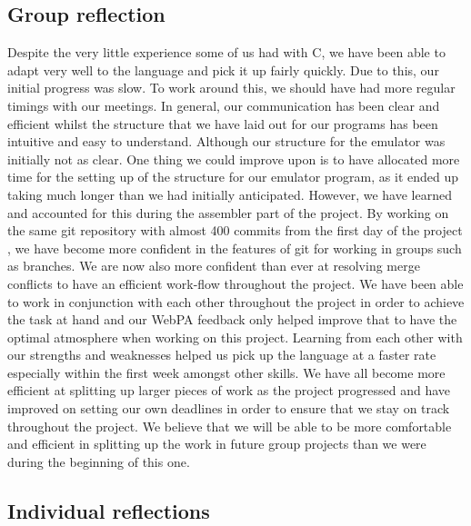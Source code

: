 \documentclass[11pt]{article}
\begin{document}
\subsection{Group reflection}
Despite the very little experience some of us had with C, we have been able to adapt very well to the language and pick it up fairly quickly. Due to this, our initial progress was slow. To work around this, we should have had more regular timings with our meetings. In general, our communication has been clear and efficient whilst the structure that we have laid out for our programs has been intuitive and easy to understand. Although our structure for the emulator was initially not as clear. One thing we could improve upon is to have allocated more time for the setting up of the structure for our emulator program, as it ended up taking much longer than we had initially anticipated. However, we have learned and accounted for this during the assembler part of the project. By working on the same git repository with almost 400 commits from the first day of the project , we have become more confident in the features of git for working in groups such as branches. We are now also more confident than ever at resolving merge conflicts to have an efficient work-flow throughout the project. We have been able to work in conjunction with each other throughout the project in order to achieve the task at hand and our WebPA feedback only helped improve that to have the optimal atmosphere when working on this project. Learning from each other with our strengths and weaknesses helped us pick up the language at a faster rate especially within the first week amongst other skills. We have all become more efficient at splitting up larger pieces of work as the project progressed and have improved on setting our own deadlines in order to ensure that we stay on track throughout the project. We believe that we will be able to be more comfortable and efficient in splitting up the work in future group projects than we were during the beginning of this one.

\subsection{Individual reflections}
\end{document}
